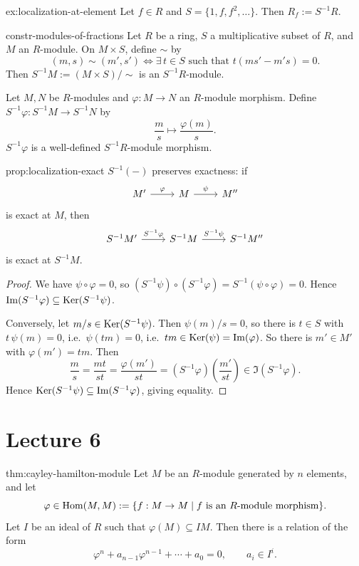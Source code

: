 \begin{example}{}{ex:localization-at-element}
Let $f \in R$ and $S = \{1,f,f^2,\ldots\}$. Then $R_f := S^{-1}R$.
\end{example}

\begin{construction}{}{constr-modules-of-fractions}
Let $R$ be a ring, $S$ a multiplicative subset of $R$, and $M$ an $R$-module. On $M \times S$, define $\sim$ by
\[
(m,s) \sim (m',s') \iff \exists\, t \in S \text{ such that } t(ms'-m's) = 0.
\]
Then $S^{-1}M := (M \times S)/{\sim}$ is an $S^{-1}R$-module.
\end{construction}

Let $M,N$ be $R$-modules and $\varphi: M \to N$ an $R$-module morphism. Define $S^{-1}\varphi: S^{-1}M \to S^{-1}N$ by
\[
\frac ms \longmapsto \frac{\varphi(m)}{s}.
\]
$S^{-1}\varphi$ is a well-defined $S^{-1}R$-module morphism.

\begin{proposition}{}{prop:localization-exact}
$S^{-1}(-)$ preserves exactness: if
\[
\begin{tikzcd}
M' \arrow[r, "\varphi"] & M \arrow[r, "\psi"] & M''
\end{tikzcd}
\]
is exact at $M$, then
\[
\begin{tikzcd}
S^{-1}M' \arrow[r, "S^{-1}\varphi"] & S^{-1}M \arrow[r, "S^{-1}\psi"] & S^{-1}M''
\end{tikzcd}
\]
is exact at $S^{-1}M$.
\end{proposition}

\begin{proof}
We have $\psi \circ \varphi = 0$, so $(S^{-1}\psi)\circ(S^{-1}\varphi) = S^{-1}(\psi\circ\varphi) = 0$. Hence $\operatorname{Im}(S^{-1}\varphi) \subseteq \operatorname{Ker}(S^{-1}\psi)$.

Conversely, let $m/s \in \operatorname{Ker}(S^{-1}\psi)$. Then $\psi(m)/s = 0$, so there is $t \in S$ with $t\,\psi(m) = 0$, i.e.\ $\psi(tm) = 0$, i.e.\ $tm \in \operatorname{Ker}(\psi) = \operatorname{Im}(\varphi)$. So there is $m' \in M'$ with $\varphi(m') = tm$. Then
\[
\frac ms = \frac{mt}{st} = \frac{\varphi(m')}{st} = (S^{-1}\varphi)\!\left(\frac{m'}{st}\right) \in \Im(S^{-1}\varphi).
\]
Hence $\operatorname{Ker}(S^{-1}\psi) \subseteq \operatorname{Im}(S^{-1}\varphi)$, giving equality.
\end{proof}

\section{Lecture 6}

\begin{theorem}{}{thm:cayley-hamilton-module}
Let $M$ be an $R$-module generated by $n$ elements, and let
\[
\varphi \in \operatorname{Hom}(M,M) := \{ f: M \to M \mid f \text{ is an } R\text{-module morphism} \}.
\]
Let $I$ be an ideal of $R$ such that $\varphi(M) \subseteq IM$. Then there is a relation of the form
\[
\varphi^n + a_{n-1}\varphi^{n-1} + \cdots + a_0 = 0, \qquad a_i \in I^i.
\]
\end{theorem}

